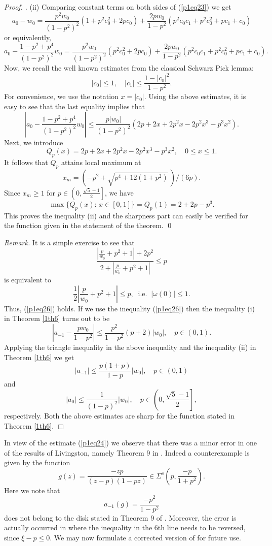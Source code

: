 \documentclass[leqno,
12pt]{amsart}
\theoremstyle{definition}
\newenvironment{rem}{\bigskip
\noindent \textsl{{\sl Remark. }}}{\bigskip}
\newcounter {own}
\newenvironment{pf}[1][]{ \vskip 3mm
 \noindent
 \ifthenelse{\equal{#1}{}}  {{\slshape Proof. }}  {{\slshape #1.} } }{\qed\bigskip}
\begin{document}
\begin{pf}
(ii) Comparing constant terms on  both sides of (\ref{p1eq23}) we get
$$a_0-w_0
= \frac{p^2 w_0}{(1-p^2)^2}(1+p^2c_0^2+2pc_0)+
\frac{2pw_0}{1-p^2}(p^2c_0c_1+p^2c_0^2+pc_1+c_0)
$$
or equivalently,
$$
a_0-\frac{1-p^2+p^4}{(1-p^2)^2}w_0
= \frac{p^2 w_0}{(1-p^2)^2}(p^2c_0^2+2pc_0)+
\frac{2pw_0}{1-p^2}(p^2c_0c_1+p^2c_0^2+pc_1+c_0).
$$
Now, we recall the well known estimates from the classical Schwarz Pick lemma:
$$|c_0|\leq 1, \quad |c_1|\leq \frac{1-|c_0|^2}{1-p^2}.
$$
For convenience, we use the notation $x= |c_0|$.
Using the above estimates, it is easy to see that the last equality
implies that
$$\left |a_0-\frac{1-p^2+p^4}{(1-p^2)^2}w_0\right|\leq
\frac{p|w_0|}{(1-p^2)^2}(2p+2x+2p^2x-2p^2x^3-p^3x^2).
$$
Next, we introduce
$$Q_p(x)= 2p+2x+2p^2x-2p^2x^3-p^3x^2, \quad 0\leq x\leq 1.
$$
It follows that $Q_p$ attains local maximum at
$$x_m= (-p^2+\sqrt{p^4+12(1+p^2)}\,)/(6p).
$$
Since $x_m\geq 1$ for
$p\in \left(0,\frac{\sqrt5 -1}{2}\right]$, we have
$$
\max\{Q_p(x):\, x\in[0,1]\}= Q_p(1)= 2+2p-p^3.
$$
This proves the inequality (ii) and the sharpness part can easily be
verified for the function given in the statement of
the theorem.
\end{pf}

\begin{rem}
It is a simple exercise to see that
\begin{equation}\label{p1eq26}
\frac{\left |\frac{p}{w_0}+p^2+1\right |+2p^2}{2+\left |\frac{p}{w_0}+p^2+1
\right |}\leq p
\end{equation}
is equivalent to
$$\frac{1}{2}\left |\frac{p}{w_0}+p^2+1\right |\leq p,
~\mbox{ i.e. }~ |\omega (0)|\leq 1 .
$$
Thus, (\ref{p1eq26}) holds.
If we use the  inequality (\ref{p1eq26}) then the inequality (i)
in Theorem \ref{1th6} turns out to be
$$
\left|a_{-1}-\frac{pw_0}{1-p^2}\right|\leq \frac{p^2}{1-p^2}(p+2)|w_0|,\quad p\in(0,1).
$$
Applying the triangle inequality in the above inequality and
the inequality (ii) in Theorem \ref{1th6} we get
\begin{equation}\label{p1eq24}
|a_{-1}|\leq \frac{p(1+p)}{1-p}|w_0|, \quad p\in (0,1)
\end{equation}
and
$$
|a_0|\leq \frac{1}{(1-p)^2}|w_0|, \quad p\in \left(0,\frac{\sqrt5 -1}{2}\right],
$$
respectively. Both the above estimates are sharp for the function stated in
Theorem \ref{1th6}.
\hfill $\Box$\end{rem}

In view of the estimate (\ref{p1eq24}) we observe that there was a minor error in
one of the results of Livingston, namely Theorem 9 in  \cite{Living-94}.
Indeed a counterexample is given by the function
$$g(z)=\frac{-zp}{(z-p)(1-pz)}\in \Sigma^{s}\left(p, \frac{-p}{1+p^2}\right).
$$
Here we note that
$$a_{-1}(g)= \frac{-p^2}{1-p^2}
$$
does not belong to the disk stated in Theorem 9 of \cite{Living-94}.
Moreover, the error is actually occurred in  \cite[p.~290]{Living-94} where the
inequality in the 6th line needs to be reversed, since $\xi-p\leq 0$.
We may now formulate a corrected version of \cite[Theorem 9]{Living-94}
for future use.
\end{document}
